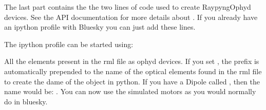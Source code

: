 \documentclass[letterpaper,10pt,english]{sphinxmanual}
\begin{document}
\begin{sphinxVerbatim}[commandchars=\\\{\}]
   
     
     
     
\end{sphinxVerbatim}

\sphinxAtStartPar
The last part contains the the two lines of code used to create RaypyngOphyd devices. See the API documentation for
more details about . If you already have an ipython profile with Bluesky you can just add these lines.

\begin{sphinxVerbatim}[commandchars=\\\{\}]
  

     
\end{sphinxVerbatim}

\sphinxAtStartPar
The ipython profile can be started using:

\begin{sphinxVerbatim}[commandchars=\\\{\}]
  
\end{sphinxVerbatim}

\sphinxAtStartPar
All the elements present in the rml file as ophyd devices. If you set , the prefix  is automatically
prepended to the name of the optical elements found in the rml file to create the dame of the object in python. If you have a Dipole called
, then the name would be: . You can now use the simulated motors as you would normally do in bluesky.
\end{document}
